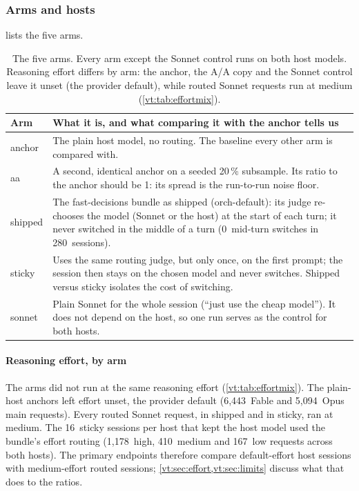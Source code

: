 \documentclass[11pt,letterpaper]{article}
\newcommand{\AAPct}{20}
\newcommand{\NShippedSessions}{280}
\newcommand{\RgEffAnchorFable}{6{,}443}
\newcommand{\RgEffAnchorOpus}{5{,}094}
\newcommand{\RgStickyHostHigh}{1{,}178}
\newcommand{\RgStickyHostLow}{167}
\newcommand{\RgStickyHostMedium}{410}
\newcommand{\RvStickyHostNFable}{16}
\newcommand{\ShippedMidturn}{0}
\begin{document}
\subsubsection{Arms and hosts}

 lists the five arms.

\begin{table}[H]
\centering\small
\caption{The five arms. Every arm except the Sonnet control runs on both host models. Reasoning effort differs by
arm: the anchor, the A/A copy and the Sonnet control leave it unset (the provider default), while routed Sonnet
requests run at medium (\cref{vt:tab:effortmix}).}
\label{vt:tab:arms}
\begin{tabular*}{\textwidth}{@{\extracolsep{\fill}}l >{\raggedright\arraybackslash}p{}@{}}
\toprule
Arm & What it is, and what comparing it with the anchor tells us \\
\midrule
anchor & The plain host model, no routing. The baseline every other arm is compared with. \\
aa & A second, identical anchor on a seeded \AAPct\,\% subsample. Its ratio to the anchor should be 1: its
  spread is the run-to-run noise floor. \\
shipped & The fast-decisions bundle as shipped (orch-default): its judge re-chooses the model (Sonnet or the
  host) at the start of each turn; it never switched in the middle of a turn (\ShippedMidturn\ mid-turn
  switches in \NShippedSessions\ sessions). \\
sticky & Uses the same routing judge, but only once, on the first prompt; the session then stays on the
  chosen model and never switches. Shipped versus sticky isolates the cost of switching. \\
sonnet & Plain Sonnet for the whole session (``just use the cheap model''). It does not depend on the host,
  so one run serves as the control for both hosts. \\
\bottomrule
\end{tabular*}
\end{table}

\paragraph{Reasoning effort, by arm} The arms did not run at the same reasoning effort (\cref{vt:tab:effortmix}). The
plain-host anchors left effort unset, the provider default (\RgEffAnchorFable\ Fable and \RgEffAnchorOpus\ Opus main
requests). Every routed Sonnet request, in shipped and in sticky, ran at medium. The \RvStickyHostNFable\ sticky
sessions per host that kept the host model used the bundle's effort routing (\RgStickyHostHigh\ high,
\RgStickyHostMedium\ medium and \RgStickyHostLow\ low requests across both hosts). The primary endpoints therefore
compare default-effort host sessions with medium-effort routed sessions; \cref{vt:sec:effort,vt:sec:limits} discuss what
that does to the ratios.
\end{document}
